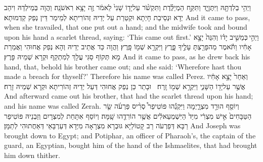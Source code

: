 {וַיְהִ֥י בְלִדְתָּ֖הּ וַיִּתֶּן\maqqaf יָ֑ד וַתִּקַּ֣ח הַמְיַלֶּ֗דֶת וַתִּקְשֹׁ֨ר עַל\maqqaf יָד֤וֹ שָׁנִי֙ לֵאמֹ֔ר זֶ֖ה יָצָ֥א רִאשֹׁנָֽה׃}
{וַהֲוָה בְּמֵילְדַהּ וִיהַב יְדָא וּנְסֵיבַת חָיְתָא וּקְטַרַת עַל יְדֵיהּ זְהוֹרִיתָא לְמֵימַר דֵּין נְפַק קַדְמוּתָא׃}
{And it came to pass, when she travailed, that one put out a hand; and the midwife took and bound upon his hand a scarlet thread, saying: ‘This came out first.’}{}
{וַיְהִ֣י \legarmeh  כְּמֵשִׁ֣יב יָד֗וֹ וְהִנֵּה֙ יָצָ֣א אָחִ֔יו וַתֹּ֕אמֶר מַה\maqqaf פָּרַ֖צְתָּ עָלֶ֣יךָ פָּ֑רֶץ וַיִּקְרָ֥א שְׁמ֖וֹ פָּֽרֶץ׃}
{וַהֲוָה כַּד אֲתֵיב יְדֵיהּ וְהָא נְפַק אֲחוּהִי וַאֲמַרַת מָא תְּקוֹף סַגִּי עֲלָךְ לְמִתְקַף וּקְרָא שְׁמֵיהּ פָּרֶץ׃}
{And it came to pass, as he drew back his hand, that, behold his brother came out; and she said: ‘Wherefore hast thou made a breach for thyself?’ Therefore his name was called Perez.}{}
{וְאַחַר֙ יָצָ֣א אָחִ֔יו אֲשֶׁ֥ר עַל\maqqaf יָד֖וֹ הַשָּׁנִ֑י וַיִּקְרָ֥א שְׁמ֖וֹ זָֽרַח׃ \setuma }
{וּבָתַר כֵּן נְפַק אֲחוּהִי דְּעַל יְדֵיהּ זְהוֹרִיתָא וּקְרָא שְׁמֵיהּ זָרַח׃}
{And afterward came out his brother, that had the scarlet thread upon his hand; and his name was called Zerah.}{}
\newperek
{}
{וְיוֹסֵ֖ף הוּרַ֣ד מִצְרָ֑יְמָה וַיִּקְנֵ֡הוּ פּוֹטִיפַר֩ סְרִ֨יס פַּרְעֹ֜ה שַׂ֤ר הַטַּבָּחִים֙ אִ֣ישׁ מִצְרִ֔י מִיַּד֙ הַיִּשְׁמְעֵאלִ֔ים אֲשֶׁ֥ר הוֹרִדֻ֖הוּ שָֽׁמָּה׃}
{וְיוֹסֵף אִתָּחַת לְמִצְרָיִם וְזַבְנֵיהּ פּוֹטִיפַר רַבָּא דְּפַרְעֹה רַב קָטוֹלַיָּא גּוּבְרָא מִצְרָאָה מִיְּדָא דְּעַרְבָּאֵי דְּאַחֲתוּהִי לְתַמָּן׃}
{And Joseph was brought down to Egypt; and Potiphar, an officer of Pharaoh’s, the captain of the guard, an Egyptian, bought him of the hand of the Ishmaelites, that had brought him down thither.}{}
